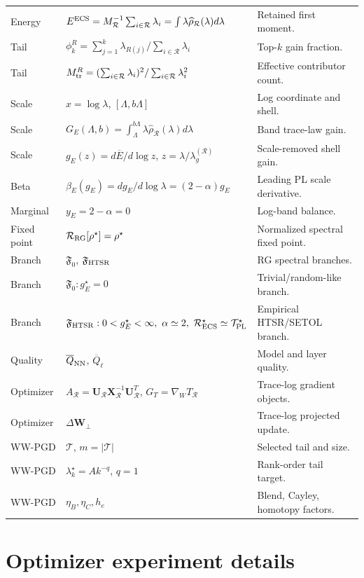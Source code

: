 \documentclass[10pt,twocolumn]{article}
\newcommand{\Fzero}{\mathfrak F_0}
\newcommand{\Fhtsr}{\mathfrak F_{\rm HTSR}}
\newcommand{\W}{\mathbf W}
\newcommand{\U}{\mathbf U}
\newcommand{\XR}{\mathbf X_{\mathcal R}}
\newcommand{\Rell}{\mathcal R}
\newcommand{\Tell}{\mathcal T}
\newcommand{\TPL}{\mathcal T_{\rm PL}}
\newcommand{\RECS}{\mathcal R_{\rm ECS}}
\newcommand{\rhohat}{\widehat\rho}
\newif\ifUseTildeECSNotation
\newcommand{\Mred}{M_{\Rell}}
\newcommand{\Ered}{\ifUseTildeECSNotation \widetilde E\else E^{\rm ECS}\fi}
\begin{document}
\begin{center}
{\begin{tabular}{@{}lll@{}}
Energy & $\Ered=\Mred^{-1}\sum_{i\in\Rell}\lambda_i=\int\lambda\rhohat_{\Rell}(\lambda)d\lambda$ & Retained first moment. \\
Tail & $\phi_k^R=\sum_{j=1}^k\lambda_{R(j)}/\sum_{i\in\Rell}\lambda_i$ & Top-$k$ gain fraction. \\
Tail & $M_{\rm tr}^R=(\sum_{i\in\Rell}\lambda_i)^2/\sum_{i\in\Rell}\lambda_i^2$ & Effective contributor count. \\
Scale & $x=\log\lambda$, $[\Lambda,b\Lambda]$ & Log coordinate and shell. \\
Scale & $G_E(\Lambda,b)=\int_{\Lambda}^{b\Lambda}\lambda\rhohat_{\Rell}(\lambda)d\lambda$ & Band trace-law gain. \\
Scale & $g_E(z)=d\overline E/d\log z$, $z=\lambda/\lambda_g^{(\Rell)}$ & Scale-removed shell gain. \\
Beta & $\beta_E(g_E)=d g_E/d\log\lambda=(2-\alpha)g_E$ & Leading PL scale derivative. \\
Marginal & $y_E=2-\alpha=0$ & Log-band balance. \\
Fixed point & $\mathcal R_{\rm RG}[\rho^\star]=\rho^\star$ & Normalized spectral fixed point. \\
Branch & $\Fzero$, $\Fhtsr$ & RG spectral branches. \\
Branch & $\Fzero:g_E^\star=0$ & Trivial/random-like branch. \\
Branch & $\Fhtsr:0<g_E^\star<\infty,\ \alpha\simeq2,\ \RECS^\star\simeq\TPL^\star$ & Empirical HTSR/SETOL branch. \\
Quality & $\overline Q_{\rm NN}$, $\overline Q_\ell$ & Model and layer quality. \\
Optimizer & $A_{\Rell}=\U_{\Rell}\XR^{-1}\U_{\Rell}^T$, $G_T=\nabla_W T_{\Rell}$ & Trace-log gradient objects. \\
Optimizer & $\Delta\W_\perp$ & Trace-log projected update. \\
WW-PGD & $\Tell$, $m=|\Tell|$ & Selected tail and size. \\
WW-PGD & $\lambda_k^\star=A k^{-q}$, $q=1$ & Rank-order tail target. \\
WW-PGD & $\eta_B,\eta_C,h_e$ & Blend, Cayley, homotopy factors. \\
\bottomrule
\end{tabular}}
\end{center}
\clearpage

\appendix
\section{Optimizer experiment details}
\label{app:optimizer_experiments}
\small
\end{document}
